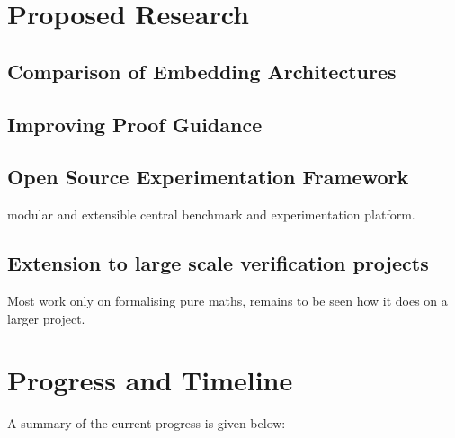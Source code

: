 \documentclass{article}
\begin{document}
    \section{Proposed Research}\label{sec:proposed-research}

    \subsection{Comparison of Embedding Architectures}\label{subsec:comparison-of-embedding-architectures}
    \subsection{Improving Proof Guidance}\label{subsec:proof-guidance}
    \subsection{Open Source Experimentation Framework}\label{subsec:open-source-experimentation-framework}
         modular and extensible central benchmark and experimentation platform.
    \subsection{Extension to large scale verification projects}\label{subsec:extension-to-large-scale-verification-projects}
        Most work only on formalising pure maths, remains to be seen how it does on a larger project.


    \section{Progress and Timeline}\label{sec:progress-and-timeline}
    A summary of the current progress is given below:
\end{document}
